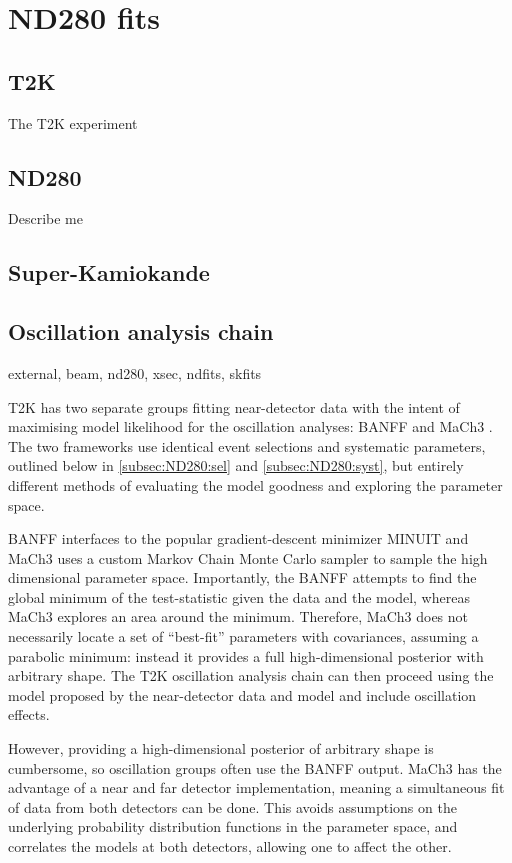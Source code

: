 \chapter{ND280 fits}
\label{chap:ND280}

\section{T2K}
The T2K experiment

\section{ND280}
Describe me

\section{Super-Kamiokande}

\section{Oscillation analysis chain}
external, beam, nd280, xsec, ndfits, skfits

T2K has two separate groups fitting near-detector data with the intent of maximising model likelihood for the oscillation analyses: BANFF  and MaCh3 . The two frameworks use identical event selections and systematic parameters, outlined below in \autoref{subsec:ND280:sel} and \autoref{subsec:ND280:syst}, but entirely different methods of evaluating the model goodness and exploring the parameter space.

BANFF interfaces to the popular gradient-descent minimizer MINUIT  and MaCh3 uses a custom Markov Chain Monte Carlo sampler to sample the high dimensional parameter space. Importantly, the BANFF attempts to find the global minimum of the test-statistic given the data and the model, whereas MaCh3 explores an area around the minimum. Therefore, MaCh3 does not necessarily locate a set of ``best-fit'' parameters with covariances, assuming a parabolic minimum: instead it provides a full high-dimensional posterior with arbitrary shape. The T2K oscillation analysis chain can then proceed using the model proposed by the near-detector data and model and include oscillation effects.

However, providing a high-dimensional posterior of arbitrary shape is cumbersome, so oscillation groups often use the BANFF output. MaCh3 has the advantage of a near and far detector implementation, meaning a simultaneous fit of data from both detectors can be done. This avoids assumptions on the underlying probability distribution functions in the parameter space, and correlates the models at both detectors, allowing one to affect the other.

